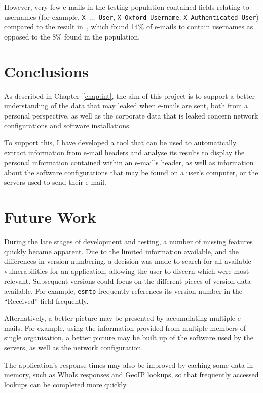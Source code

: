 However, very few e-mails in the testing population contained fields relating
to usernames (for example, \texttt{X-}$\ldots$\texttt{-User}, \texttt{X-Oxford-Username},
\texttt{X-Authenticated-User}) compared to the result
in~\cite{nurse2015investigating}, which found 14\% of e-mails to contain
usernames as opposed to the 8\% found in the population.

\section{Conclusions}

As described in Chapter~\ref{chap:int}, the aim of this project is to support a
better understanding of the data that may leaked when e-mails are sent, both
from a personal perspective, as well as the corporate data that is leaked
concern network configurations and software installations.

To support this, I have developed a tool that can be used to automatically
extract information from e-mail headers and analyse its results to display the
personal information contained within an e-mail's header, as well as
information about the software configurations that may be found on a user's
computer, or the servers used to send their e-mail.


\section{Future Work}

During the late stages of development and testing, a number of missing features
quickly became apparent. Due to the limited information available, and the
differences in version numbering, a decision was made to search for all
available vulnerabilities for an application, allowing the user to discern
which were most relevant.  Subsequent versions could focus on the different
pieces of version data available.  For example, \texttt{esmtp} frequently
references its version number in the ``Received'' field frequently.

Alternatively, a better picture may be presented by accumulating multiple
e-mails. For example, using the information provided from multiple members of
single organisation, a better picture may be built up of the software used by
the servers, as well as the network configuration.

The application's response times may also be improved by caching some data in
memory, such as WhoIs responses and GeoIP lookups, so that frequently accessed
lookups can be completed more quickly.

